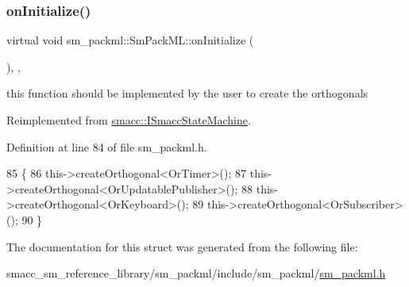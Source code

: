 \subsubsection{\texorpdfstring{on\+Initialize()}{onInitialize()}}
{\footnotesize\ttfamily virtual void sm\+\_\+packml\+::\+Sm\+Pack\+M\+L\+::on\+Initialize (\begin{DoxyParamCaption}{ }\end{DoxyParamCaption})\hspace{0.3cm}{\ttfamily [inline]}, {\ttfamily [override]}, {\ttfamily [virtual]}}



this function should be implemented by the user to create the orthogonals 



Reimplemented from \hyperlink{classsmacc_1_1ISmaccStateMachine_ac2982c6c8283663e5e1e8a7c82f511ec}{smacc\+::\+I\+Smacc\+State\+Machine}.



Definition at line 84 of file sm\+\_\+packml.\+h.


\begin{DoxyCode}
85     \{
86         this->createOrthogonal<OrTimer>();
87         this->createOrthogonal<OrUpdatablePublisher>();
88         this->createOrthogonal<OrKeyboard>();
89         this->createOrthogonal<OrSubscriber>();
90     \}
\end{DoxyCode}


The documentation for this struct was generated from the following file\+:\begin{DoxyCompactItemize}
\item 
smacc\+\_\+sm\+\_\+reference\+\_\+library/sm\+\_\+packml/include/sm\+\_\+packml/\hyperlink{sm__packml_8h}{sm\+\_\+packml.\+h}\end{DoxyCompactItemize}

